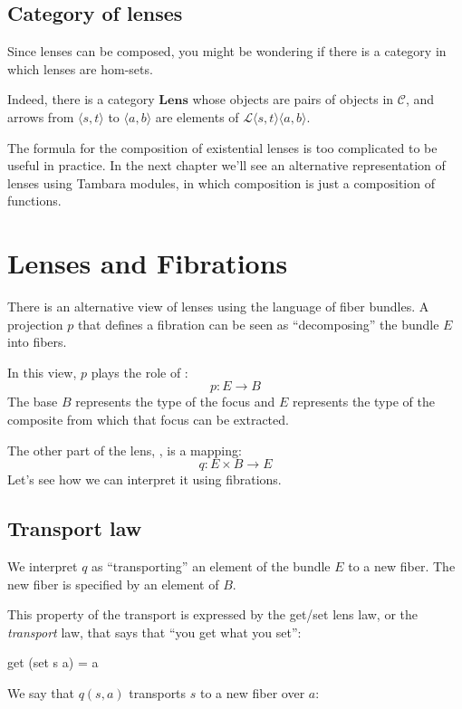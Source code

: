 \documentclass[DaoFP]{subfiles}
\begin{document}
\subsection{Category of lenses}

Since lenses can be composed, you might be wondering if there is a category in which lenses are hom-sets. 

Indeed, there is a category $\mathbf{Lens}$ whose objects are pairs of objects in $\mathcal{C}$, and arrows from $\langle s, t\rangle$ to $ \langle a, b \rangle$ are elements of  $\mathcal{L} \langle s, t\rangle \langle a, b \rangle$.

The formula for the composition of existential lenses is too complicated to be useful in practice. In the next chapter we'll see an alternative representation of lenses using Tambara modules, in which composition is just a composition of functions.

\section{Lenses and Fibrations}

There is an alternative view of lenses using the language of fiber bundles. A projection $p$ that defines a fibration can be seen as ``decomposing'' the bundle $E$ into fibers. 

In this view, $p$ plays the role of :
\[ p \colon E \to B \]
The base $B$ represents the type of the focus and $E$ represents the type of the composite from which that focus can be extracted.

The other part of the lens, , is a mapping: 
\[ q \colon E \times B \to E \]
Let's see how we can interpret it using fibrations.
\subsection{Transport law}

We interpret $q$ as ``transporting'' an element of the bundle $E$ to a new fiber. The new fiber is specified by an element of $B$.

This property of the transport is expressed by the get/set lens law, or the \emph{transport} law, that says that ``you get what you set'':
\begin{haskell}
get (set s a) = a
\end{haskell}
We say that $q(s, a)$ transports $s$ to a new fiber over $a$:
\end{document}
